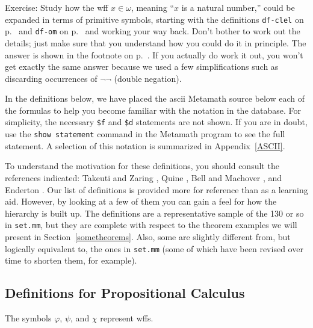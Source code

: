 Exercise:  Study how the wff $x\in\omega$, meaning ``$x$ is a natural
number,'' could be expanded in terms of primitive symbols, starting with the
definitions \texttt{df-clel} on p.~\pageref{dfclel} and \texttt{df-om} on
p.~\pageref{dfom} and working your way back.  Don't bother to work out the
details; just make sure that you understand how you could do it in principle.
The answer is shown in the footnote on p.~\pageref{expandom}.  If you
actually do work it out, you won't get exactly the same answer because we used
a few simplifications such as discarding occurrences of $\lnot\lnot$ (double
negation).

In the definitions below, we have placed the {\sc ascii} Metamath source
below each of the formulas to help you become familiar with the
notation in the database.  For simplicity, the necessary \texttt{\$f}
and \texttt{\$d} statements are not shown.  If you are in doubt, use the
\texttt{show statement} command
in the Metamath program to see the full statement.
A selection of this notation is summarized in Appendix~\ref{ASCII}.

To understand the motivation for these definitions, you should consult the
references indicated:  Takeuti and Zaring \cite{Takeuti},
Quine \cite{Quine}, Bell and Machover
\cite{Bell}, and Enderton \cite{Enderton}.  Our list of definitions is provided more for reference than as a
learning aid.  However, by looking at a few of them you can gain a feel for
how the hierarchy is built up.  The definitions are a representative sample of
the 130 or so in \texttt{set.mm}, but they are complete with respect to the
theorem examples we will present in Section~\ref{sometheorems}.  Also, some are
slightly different from, but logically equivalent to, the ones in \texttt{set.mm}
(some of which have been revised over time to shorten them, for example).

\subsection{Definitions for Propositional Calculus}\label{metadefprop}

The symbols $\varphi$, $\psi$, and $\chi$ represent wffs.

